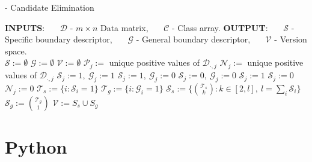 \begin{Algorithm}[H]{12cm}
  \caption{ - Candidate Elimination}
  \begin{algorithmic} 
    \State \textbf{INPUTS}: 
    \State \ \ \ $\mathcal{D}$ - $m \times n$ Data matrix,
    \State \ \ \ $\mathcal{C}$ - Class array.
    \State \textbf{OUTPUT}: 
    \State \ \ \ $\mathcal{S}$ - Specific boundary descriptor,
    \State \ \ \ $\mathcal{G}$ - General boundary descriptor, 
    \State \ \ \ $\mathcal{V}$ - Version space.
    \\
    \hrulefill
      \State $\mathcal{S} := \emptyset$
      \State $\mathcal{G} := \emptyset$
      \State $\mathcal{V} := \emptyset$
        \State $\mathcal{P}_j :=$ unique positive values of $\mathcal{D}_{\cdot,j}$
        \State $\mathcal{N}_j :=$ unique positive values of $\mathcal{D}_{\cdot,j}$
          \State $\mathcal{S}_j := 1,\ \mathcal{G}_j := 1$
          \State $\mathcal{S}_j := 1,\ \mathcal{G}_j := 0$
          \State $\mathcal{S}_j := 0,\ \mathcal{G}_j := 0$
            \State $\mathcal{S}_j := 1$
          \Else
            \State $\mathcal{S}_j := 0$
          \EndIf
          \State $\mathcal{N}_j := 0$
        \EndIf
      \EndFor
      \State $\mathcal{T}_s := \{i : \mathcal{S}_i = 1\}$
      \State $\mathcal{T}_g := \{i : \mathcal{G}_i = 1\}$
      \State $\mathcal{S}_s := \{\binom{\mathcal{T}_s}{k} : k \in [2,l],\ l = \sum_i \mathcal{S}_i\}$
      \State $\mathcal{S}_g := \binom{\mathcal{T}_g}{1}$
      \State $\mathcal{V} := S_s \cup S_g$
    \EndFunction
  \end{algorithmic}
\end{Algorithm}


\section*{Python}








